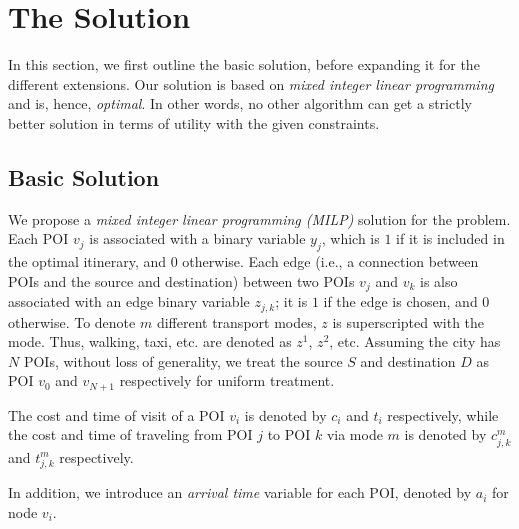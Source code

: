 \section{The \trip Solution}
\label{sec:ilp}

In this section, we first outline the basic solution, before expanding it for
the different extensions.
Our solution is based on \emph{mixed integer linear programming} and is, hence,
\emph{optimal}.
In other words, no other algorithm can get a strictly better solution in terms
of utility with the given constraints.

\subsection{Basic Solution}
\label{sec:basic}

We propose a \emph{mixed integer linear programming (MILP)} solution for
the \trip problem.  Each POI $v_{j}$ is associated with a binary
variable $y_{j}$, which is $1$ if it is included in the optimal
itinerary, and $0$ otherwise.  Each edge (i.e., a connection between
POIs and the source and destination) between two POIs $v_{j}$ and
$v_{k}$ is also associated with an edge binary variable $z_{j,k}$; it is
$1$ if the edge is chosen, and $0$ otherwise.  To denote $m$ different
transport modes, $z$ is superscripted with the mode.  Thus, walking,
taxi, etc. are denoted as $z^1$, $z^2$, etc.  Assuming the city has $N$
POIs, without loss of generality, we treat the source $S$ and
destination $D$ as POI $v_{0}$ and $v_{{N+1}}$ respectively for uniform
treatment.  

The cost and time of visit of a POI $v_i$ is denoted by
$c_i$ and $t_i$ respectively, while the cost and time of traveling from
POI $j$ to POI $k$ via mode $m$ is denoted by $c^{m}_{j,k}$ and $t^{m}_{j,k}$ respectively.

In addition, 
we introduce an \emph{arrival time} variable for each POI, denoted by $a_i$ for node $v_i$.

